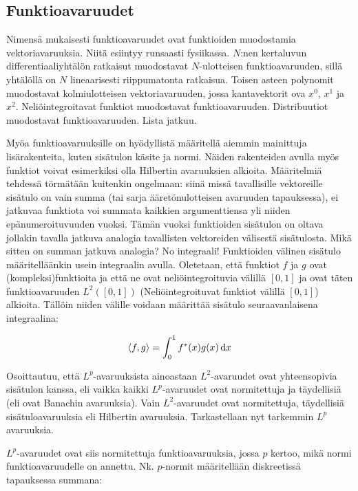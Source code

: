 \documentclass[../johdoksia.tex]{subfiles}
\begin{document}
	\subsection{Funktioavaruudet}
	
	Nimensä mukaisesti funktioavaruudet ovat funktioiden muodostamia vektoriavaruuksia. Niitä esiintyy runsaasti fysiikassa. $N$:nen kertaluvun differentiaaliyhtälön ratkaisut muodostavat $N$-ulotteisen funktioavaruuden, sillä yhtälöllä on $N$ lineaarisesti riippumatonta ratkaisua. Toisen asteen polynomit muodostavat kolmiulotteisen vektoriavaruuden, jossa kantavektorit ova $x^0$, $x^1$ ja $x^2$. Neliöintegroitavat funktiot muodostavat funktioavaruuden. Distribuutiot muodostavat funktioavaruuden. Lista jatkuu.
	
	Myöa funktioavaruuksille on hyödyllistä määritellä aiemmin mainittuja lisärakenteita, kuten sisätulon käsite ja normi. Näiden rakenteiden avulla myös funktiot voivat esimerkiksi olla Hilbertin avaruuksien alkioita. Määritelmiä tehdessä törmätään kuitenkin ongelmaan: siinä missä tavallisille vektoreille sisätulo on vain summa (tai sarja ääretönulotteisen avaruuden tapauksessa), ei jatkuvaa funktiota voi summata kaikkien argumenttiensa yli niiden epänumeroituvuuden vuoksi. Tämän vuoksi funktioiden sisätulon on oltava jollakin tavalla jatkuva analogia tavallisten vektoreiden välisestä sisätulosta. Mikä sitten on summan jatkuva analogia? No integraali! Funktioiden välinen sisätulo määritelläänkin usein integraalin avulla. Oletetaan, että funktiot $f$ ja $g$ ovat (kompleksi)funktioita ja että ne ovat neliöintegroituvia välillä $[0, 1]$ ja ovat täten funktioavaruuden $L^2([0,1])$ (Neliöintegroituvat funktiot välillä $[0,1]$) alkioita. Tällöin niiden välille voidaan määrittää sisätulo seuraavanlaisena integraalina:
	
	\begin{equation}
		\inprod{f}{g} = \int_{0}^{1}f^{\ast}(x)g(x)\odif{x}
	\end{equation}

	Osoittautuu, että $L^p$-avaruuksista ainoastaan $L^2$-avaruudet ovat yhteensopivia sisätulon kanssa, eli vaikka kaikki $L^p$-avaruudet ovat normitettuja ja täydellisiä (eli ovat Banachin avaruuksia). Vain $L^2$-avaruudet ovat normitettuja, täydellisiä sisätuloavaruuksia eli Hilbertin avaruuksia. Tarkastellaan nyt tarkemmin $L^p$ avaruuksia.
	
	$L^p$-avaruudet ovat siis normitettuja funktioavaruuksia, jossa $p$ kertoo, mikä normi funktioavaruudelle on annettu. Nk. $p$-normit määritellään diskreetissä tapauksessa summana:
	
\end{document}
